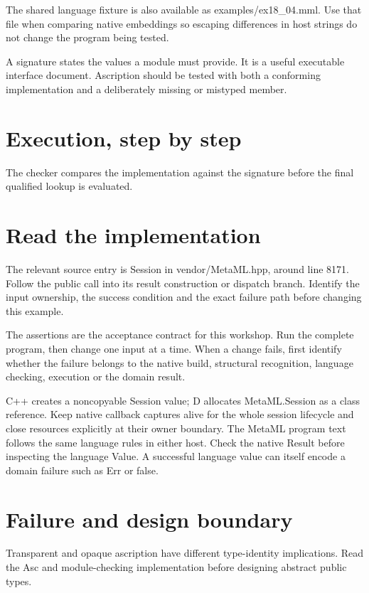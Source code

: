 The shared language fixture is also available as examples/ex18\_04.mml. Use that file when comparing native embeddings so escaping differences in host strings do not change the program being tested.

\clearpage
{}
A signature states the values a module must provide. It is a useful executable interface document. Ascription should be tested with both a conforming implementation and a deliberately missing or mistyped member.


\section*{Execution, step by step}
The checker compares the implementation against the signature before the final qualified lookup is evaluated.

\section*{Read the implementation}
The relevant source entry is Session in vendor/MetaML.hpp, around line 8171. Follow the public call into its result construction or dispatch branch. Identify the input ownership, the success condition and the exact failure path before changing this example.

The assertions are the acceptance contract for this workshop. Run the complete program, then change one input at a time. When a change fails, first identify whether the failure belongs to the native build, structural recognition, language checking, execution or the domain result.

\clearpage
{}
C++ creates a noncopyable Session value; D allocates MetaML.Session as a class reference. Keep native callback captures alive for the whole session lifecycle and close resources explicitly at their owner boundary. The MetaML program text follows the same language rules in either host. Check the native Result before inspecting the language Value. A successful language value can itself encode a domain failure such as Err or false.


\section*{Failure and design boundary}
Transparent and opaque ascription have different type-identity implications. Read the Asc and module-checking implementation before designing abstract public types.

